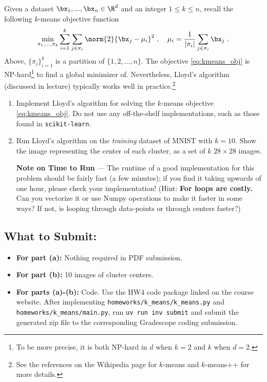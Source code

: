\documentclass{article}
\begin{document}
\begin{aprob}
Given a dataset $\bx_1,..., \bx_n \in \R^{d}$ and an integer $1 \leq k \leq n$, recall the following $k$-means objective function
\begin{align}
    \min_{\pi_1, ..., \pi_k} \sum_{i=1}^{k} \sum_{j \in \pi_i} \norm{2}{ \bx_j - \mu_{i} }^2 \ , \quad \mu_i = \frac{1}{|\pi_i|} \sum_{j \in \pi_i} \bx_j \ . \label{eq:kmeans_obj}
\end{align}
Above, $\{\pi_i\}_{i=1}^{k}$ is a partition of $\{1, 2, ..., n\}$. The objective \eqref{eq:kmeans_obj} is NP-hard\footnote{
To be more precise, it is both NP-hard in $d$ when $k=2$ and $k$ when $d=2$.} to find a global minimizer of. Nevertheless, Lloyd's algorithm (discussed in lecture) typically works well in practice.\footnote{See the references on the Wikipedia page for $k$-means and $k$-means++ for more details.}

\medskip


\begin{enumerate}
    \item {} Implement Lloyd's algorithm for solving the $k$-means objective \eqref{eq:kmeans_obj}. Do not use any off-the-shelf implementations, such as those found in \texttt{scikit-learn}.
    
    \item {} Run Lloyd's algorithm on the \emph{training} dataset of MNIST with $k=10$. Show the image representing the center of each cluster, as a set of $k$ $28\times 28$ images.
    
\vspace{.8em}
\textbf{Note on Time to Run} --- The runtime of a good implementation for this problem should be fairly fast (a few minutes); if you find it taking upwards of one hour, please check your implementation! (Hint: \textbf{For loops are costly.} Can you vectorize it or use Numpy operations to make it faster in some ways? If not, is looping through data-points or through centers faster?)

\end{enumerate}
 \subsection*{What to Submit:}
    \begin{itemize}
        \item \textbf{For part (a):} Nothing required in PDF submission.
        \item \textbf{For part (b):} 10 images of cluster centers.
        \item \textbf{For parts (a)-(b):} Code. Use the HW4 code package linked on the course website. After implementing \texttt{homeworks/k\_means/k\_means.py} and \texttt{homeworks/k\_means/main.py}, run \texttt{uv run inv submit} and submit the generated zip file to the corresponding Gradescope coding submission.
    \end{itemize}
\end{aprob}
\end{document}
